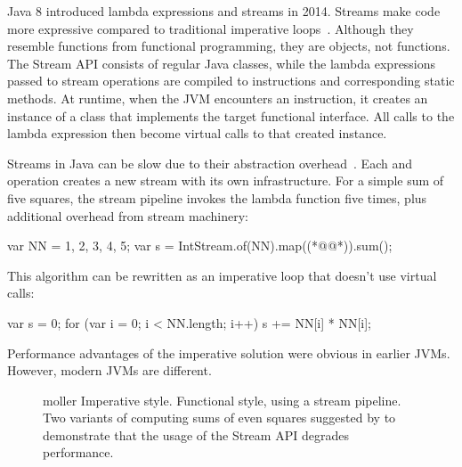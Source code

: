 
Java 8 introduced lambda expressions and streams in 2014.
Streams make code more expressive compared to traditional imperative loops~\citep{khatchadourian2020study}.
Although they resemble functions from functional programming, they are objects, not functions.
The Stream API consists of regular Java classes, while the lambda expressions passed to stream operations are compiled to  instructions and corresponding static methods.
At runtime, when the JVM encounters an  instruction, it creates an instance of a class that implements the target functional interface.
All calls to the lambda expression then become virtual calls to that created instance.

Streams in Java can be slow due to their abstraction overhead~\citep{kiselyov2017,khatchadourian2020study}.
Each  and  operation creates a new stream with its own infrastructure.
For a simple sum of five squares, the stream pipeline invokes the lambda function five times, plus additional overhead from stream machinery:
\begin{ffcode}
var NN = {1, 2, 3, 4, 5};
var s = IntStream.of(NN).map((*@@*)).sum();
\end{ffcode}
This algorithm can be rewritten as an imperative loop that doesn't use virtual calls:
\begin{ffcode}
var s = 0;
for (var i = 0; i < NN.length; i++)
  s += NN[i] * NN[i];
\end{ffcode}

Performance advantages of the imperative solution were obvious in earlier JVMs.
However, modern JVMs are different.

\begin{figure}
\begin{subfigure}[t]{\firstsf}

\end{subfigure}
\hfill
\begin{subfigure}[t]{\secondsf}

\end{subfigure}
\twofigcaps
  {moller}
  {Imperative style.}
  {Functional style, using a stream pipeline.}
  {Two variants of computing sums of even squares suggested by \citet{moller2020eliminating} to demonstrate that the usage of the Stream API degrades performance.}
\end{figure}

